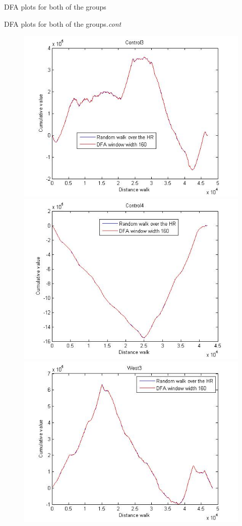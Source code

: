\documentclass[t,12pt,english
\ifx\beamermode\undefined\else,\beamermode\fi
]{beamer}
\begin{document}
\begin{frame}{DFA plots for both of the groups}
    
\end{frame}

\begin{frame}{DFA plots for both of the groups.\textit{cont}}

\begin{figure}[!htbp]
%
\centering
\includegraphics[width=.7\textwidth]{E5.jpg}\\
\includegraphics[width=.7\textwidth]{E6.jpg}\\
\endminipage\hfill
{}%
\centering
\includegraphics[width=.7\textwidth]{E10.jpg}\\

\end{figure}
\end{frame}
\end{document}
